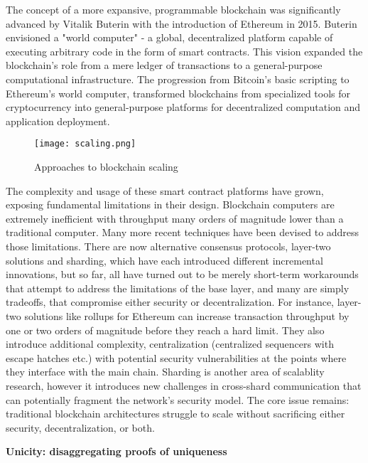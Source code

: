 \documentclass{article}
\begin{document}
\vspace{2mm}

The concept of a more expansive, programmable blockchain was significantly advanced by Vitalik Buterin with the introduction of Ethereum in 2015. Buterin envisioned a "world computer" - a global, decentralized platform capable of executing arbitrary code in the form of smart contracts. This vision expanded the blockchain's role from a mere ledger of transactions to a general-purpose computational infrastructure. The progression from Bitcoin's basic scripting to Ethereum's world computer, transformed blockchains from specialized tools for cryptocurrency into general-purpose platforms for decentralized computation and application deployment.

\begin{figure}[H]
    \centering
    \texttt{[image: scaling.png]}
    \caption{Approaches to blockchain scaling }
    \label{fig:scaling}
\end{figure}


The complexity and usage of these smart contract platforms have grown, exposing fundamental limitations in their design. Blockchain computers are extremely inefficient with throughput many orders of magnitude lower than a traditional computer. Many more recent techniques have been devised to address those limitations. There are now alternative consensus protocols, layer-two solutions and sharding, which have each introduced different incremental innovations, but so far, all have turned out to be merely short-term workarounds that attempt to address the limitations of the base layer, and many are simply tradeoffs, that compromise either security or decentralization. For instance, layer-two solutions like rollups for Ethereum can increase transaction throughput by one or two orders of magnitude before they reach a hard limit. They also introduce additional complexity, centralization (centralized sequencers with escape hatches etc.) with potential security vulnerabilities at the points where they interface with the main chain. Sharding is another area of scalablity research, however it introduces new challenges in cross-shard communication that can potentially fragment the network's security model. The core issue remains: traditional blockchain architectures struggle to scale without sacrificing either security, decentralization, or both. 
\vspace{2mm}

\textbf{Unicity: disaggregating proofs of uniqueness}
\vspace{2mm}
\end{document}
